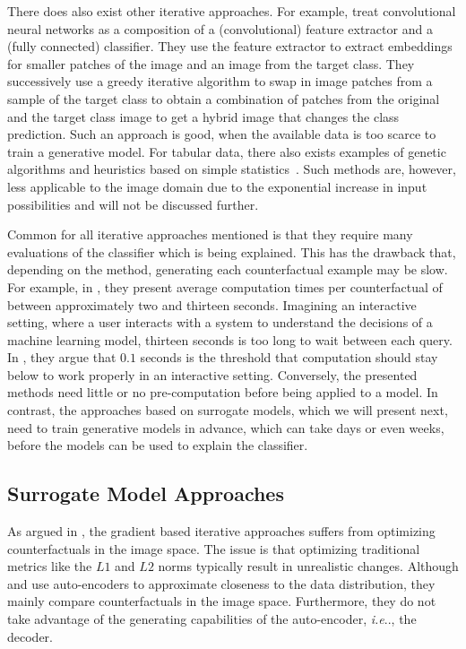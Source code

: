 \documentclass[11pt,a4paper,twoside,openright,final]{memoir}
\makeatletter
\DeclareRobustCommand\onedot{\futurelet\@let@token\@onedot}
\def\@onedot{\ifx\@let@token.\else.\null\fi\xspace}
\def\ie{\emph{i.e}\onedot} \def\Ie{\emph{I.e}\onedot}
\makeatother
\begin{document}
There does also exist other iterative approaches.
For example, \citet{goyal19a} treat convolutional neural networks as a composition of a (convolutional) feature extractor and a (fully connected) classifier.
They use the feature extractor to extract embeddings for smaller patches of the image and an image from the target class. 
They successively use a greedy iterative algorithm to swap in image patches from a sample of the target class to obtain a combination of patches from the original and the target class image to get a hybrid image that changes the class prediction.
Such an approach is good, when the available data is too scarce to train a generative model. 
For tabular data, there also exists examples of genetic algorithms \cite{Hashemi2020} and heuristics based on simple statistics~\cite{Gomez2020}.
Such methods are, however, less applicable to the image domain due to the exponential increase in input possibilities and will not be discussed further. 

Common for all iterative approaches mentioned is that they require many evaluations of the classifier which is being explained.
This has the drawback that, depending on the method, generating each counterfactual example may be slow.
For example, in \cite{VanLooveren2019}, they present average computation times per counterfactual of between approximately two and thirteen seconds.
Imagining an interactive setting, where a user interacts with a system to understand the decisions of a machine learning model, thirteen seconds is too long to wait between each query.
In \cite{card1991information}, they argue that $0.1$ seconds is the threshold that computation should stay below to work properly in an interactive setting.
Conversely, the presented methods need little or no pre-computation before being applied to a model.
In contrast, the approaches based on surrogate models, which we will present next, need to train generative models in advance, which can take days or even weeks, before the models can be used to explain the classifier.

\subsection{Surrogate Model Approaches} 

As argued in \cite{Rodriguez2021}, the gradient based iterative approaches suffers from optimizing counterfactuals in the image space.
The issue is that optimizing traditional metrics like the $L1$ and $L2$ norms typically result in unrealistic changes. 
Although \cite{Dhurandhar2018} and \cite{VanLooveren2019} use auto-encoders to approximate closeness to the data distribution, they mainly compare counterfactuals in the image space.
Furthermore, they do not take advantage of the generating capabilities of the auto-encoder, \ie, the decoder. 
\end{document}
